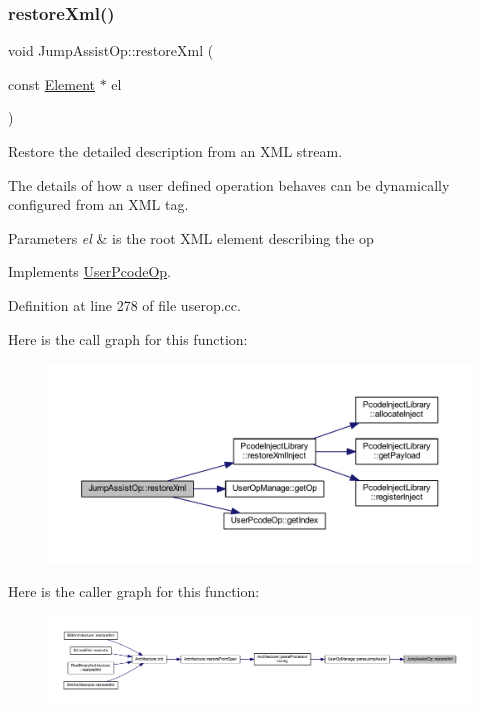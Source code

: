 \subsubsection{\texorpdfstring{restoreXml()}{restoreXml()}}
{\footnotesize\ttfamily void Jump\+Assist\+Op\+::restore\+Xml (\begin{DoxyParamCaption}\item[{const \mbox{\hyperlink{class_element}{Element}} $\ast$}]{el }\end{DoxyParamCaption})\hspace{0.3cm}{\ttfamily [virtual]}}



Restore the detailed description from an X\+ML stream. 

The details of how a user defined operation behaves can be dynamically configured from an X\+ML tag. 
\begin{DoxyParams}{Parameters}
{\em el} & is the root X\+ML element describing the op \\
\hline
\end{DoxyParams}


Implements \mbox{\hyperlink{class_user_pcode_op_a2a7b7c637369bc4fba4604cd83a937af}{User\+Pcode\+Op}}.



Definition at line 278 of file userop.\+cc.

Here is the call graph for this function\+:
\nopagebreak
\begin{figure}[H]
\begin{center}
\leavevmode
\includegraphics[width=350pt]{class_jump_assist_op_a2e246c75988410d0fbdae74e44eb09cc_cgraph}
\end{center}
\end{figure}
Here is the caller graph for this function\+:
\nopagebreak
\begin{figure}[H]
\begin{center}
\leavevmode
\includegraphics[width=350pt]{class_jump_assist_op_a2e246c75988410d0fbdae74e44eb09cc_icgraph}
\end{center}
\end{figure}


